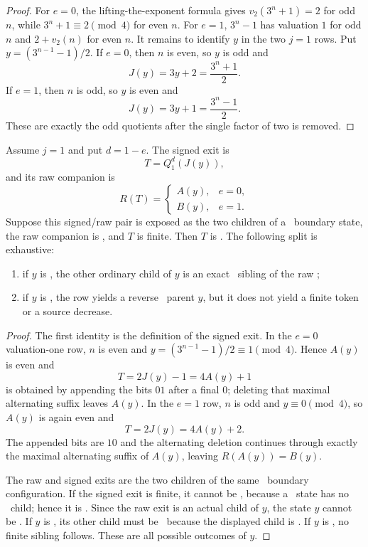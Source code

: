 \begin{proof}
For $e=0$, the lifting-the-exponent formula gives
$v_2(3^n+1)=2$ for odd $n$, while $3^n+1\equiv2\pmod4$ for even $n$.
For $e=1$, $3^n-1$ has valuation $1$ for odd $n$ and
$2+v_2(n)$ for even $n$.  It remains to identify $y$ in the two $j=1$
rows.  Put $y=(3^{n-1}-1)/2$.  If $e=0$, then $n$ is even, so $y$ is odd
and
\[
 J(y)=3y+2=\frac{3^n+1}{2}.
\]
If $e=1$, then $n$ is odd, so $y$ is even and
\[
 J(y)=3y+1=\frac{3^n-1}{2}.
\]
These are exactly the odd quotients after the single factor of two is
removed.
\end{proof}

\begin{lemma}[Correct raw selector in the $j=1$ row]\label{lem:zero-j1}
Assume $j=1$ and put $d=1-e$.  The signed exit is
\[
  T=Q_1^d(J(y)),
\]
and its raw companion is
\[
  R(T)=
  \begin{cases}
    A(y),&e=0,\\
    B(y),&e=1.
  \end{cases}
\]
Suppose this signed/raw pair is exposed as the two children of a \DRAW\
boundary state, the raw companion is \DRAW, and $T$ is finite.  Then $T$ is
\WIN.  The following split is exhaustive:
\begin{enumerate}[label=(\roman*)]
\item if $y$ is \WIN, the other ordinary child of $y$ is an exact
      \LOSS\ sibling of the raw \DRAW;
\item if $y$ is \DRAW, the row yields a reverse \DRAW\ parent $y$, but it
      does not yield a finite token or a source decrease.
\end{enumerate}
\end{lemma}

\begin{proof}
The first identity is the definition of the signed exit.  In the $e=0$
valuation-one row, $n$ is even and
$y=(3^{n-1}-1)/2\equiv1\pmod4$.  Hence $A(y)$ is even and
\[
 T=2J(y)-1=4A(y)+1
\]
is obtained by appending the bits $01$ after a final $0$; deleting that
maximal alternating suffix leaves $A(y)$.  In the $e=1$ row, $n$ is odd and
$y\equiv0\pmod4$, so $A(y)$ is again even and
\[
 T=2J(y)=4A(y)+2.
\]
The appended bits are $10$ and the alternating deletion continues through
exactly the maximal alternating suffix of $A(y)$, leaving
$R(A(y))=B(y)$.

The raw and signed exits are the two children of the same \DRAW\ boundary
configuration.  If the signed exit is finite, it cannot be \LOSS, because a
\DRAW\ state has no \LOSS\ child; hence it is \WIN.  Since the raw exit is
an actual child of $y$, the state $y$ cannot be \LOSS.  If $y$ is \WIN, its
other child must be \LOSS\ because the displayed child is \DRAW.  If $y$
is \DRAW, no finite sibling follows.  These are all possible outcomes of
$y$.
\end{proof}

